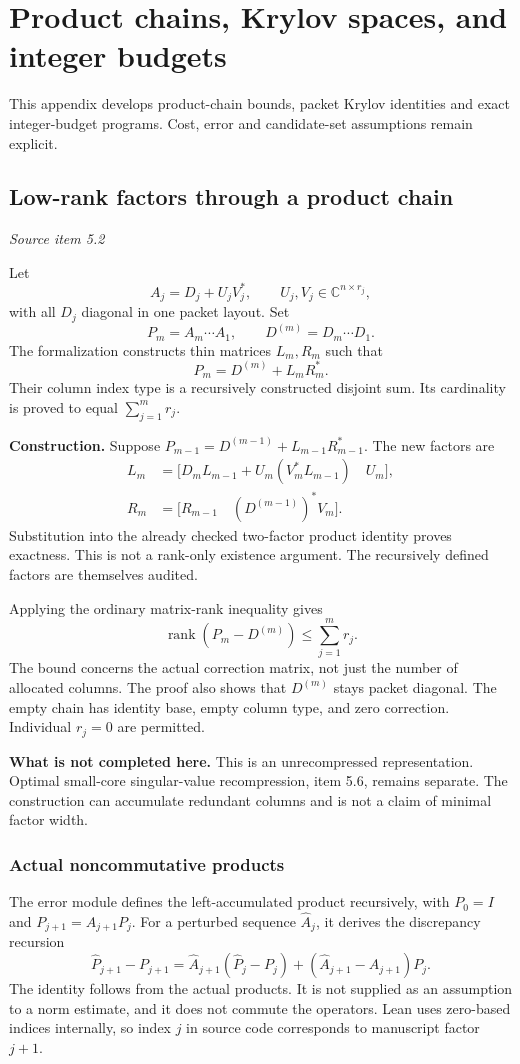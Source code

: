 \clearpage\FloatBarrier\section{Product chains, Krylov spaces, and integer budgets}\label{supp3:section:001}
This appendix develops product-chain bounds, packet Krylov identities and exact integer-budget programs. Cost, error and candidate-set assumptions remain explicit.\par

\subsection{Low-rank factors through a product chain}\label{supp3:subsection:001}\textit{Source item 5.2}\par
Let
\[
A_j=D_j+U_jV_j^*,\qquad U_j,V_j\in\mathbb C^{n\times r_j},
\]
with all $D_j$ diagonal in one packet layout. Set
\[
P_m=A_m\cdots A_1,\qquad D^{(m)}=D_m\cdots D_1.
\]
The formalization constructs thin matrices $L_m,R_m$ such that
\[
\boxed{P_m=D^{(m)}+L_mR_m^*.}
\]
Their column index type is a recursively constructed disjoint sum. Its cardinality is proved to equal $\sum_{j=1}^m r_j$.

\textbf{Construction.} Suppose $P_{m-1}=D^{(m-1)}+L_{m-1}R_{m-1}^*$. The new factors are
\begin{align*}
L_m&=\bigl[D_mL_{m-1}+U_m(V_m^*L_{m-1})\quad U_m\bigr],\\
R_m&=\bigl[R_{m-1}\quad (D^{(m-1)})^*V_m\bigr].
\end{align*}
Substitution into the already checked two-factor product identity proves exactness. This is not a rank-only existence argument. The recursively defined factors are themselves audited.

Applying the ordinary matrix-rank inequality gives
\[
\boxed{\operatorname{rank}(P_m-D^{(m)})\leq\sum_{j=1}^m r_j.}
\]
The bound concerns the actual correction matrix, not just the number of allocated columns. The proof also shows that $D^{(m)}$ stays packet diagonal. The empty chain has identity base, empty column type, and zero correction. Individual $r_j=0$ are permitted.

\textbf{What is not completed here.} This is an unrecompressed representation. Optimal small-core singular-value recompression, item 5.6, remains separate. The construction can accumulate redundant columns and is not a claim of minimal factor width.

\subsubsection{Actual noncommutative products}
The error module defines the left-accumulated product recursively, with $P_0=I$ and $P_{j+1}=A_{j+1}P_j$. For a perturbed sequence $\widehat A_j$, it derives the discrepancy recursion
\[
\widehat P_{j+1}-P_{j+1}
=\widehat A_{j+1}(\widehat P_j-P_j)
 +(\widehat A_{j+1}-A_{j+1})P_j.
\]
The identity follows from the actual products. It is not supplied as an assumption to a norm estimate, and it does not commute the operators. Lean uses zero-based indices internally, so index $j$ in source code corresponds to manuscript factor $j+1$.



